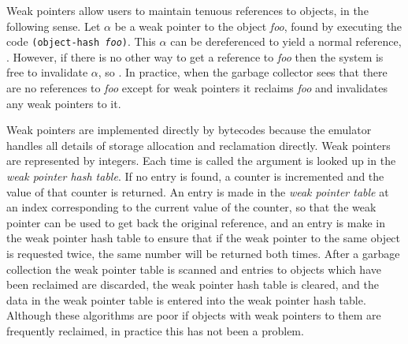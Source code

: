 Weak pointers allow users to maintain tenuous references to objects,
in the following sense.  Let $\alpha$ be a weak pointer to the object
\emph{foo}, found by executing the code \texttt{(object-hash \emph{foo})}.
This $\alpha$ can be dereferenced to yield a normal reference,
.  However, if there is no
other way to get a reference to \emph{foo} then the system is free to
invalidate $\alpha$, so .  In
practice, when the garbage collector sees that there are no references
to \emph{foo} except for weak pointers it reclaims \emph{foo} and
invalidates any weak pointers to it.

Weak pointers are implemented directly by bytecodes because the
emulator handles all details of storage allocation and reclamation
directly.  Weak pointers are represented by integers.  Each time
 is called the argument is looked up in the
\emph{weak pointer hash table}.  If no entry is found, a counter is
incremented and the value of that counter is returned.  An entry is
made in the \emph{weak pointer table} at an index corresponding to the
current value of the counter, so that the weak pointer can be used to
get back the original reference, and an entry is make in the weak
pointer hash table to ensure that if the weak pointer to the same
object is requested twice, the same number will be returned both
times.  After a garbage collection the weak pointer table is scanned
and entries to objects which have been reclaimed are discarded, the
weak pointer hash table is cleared, and the data in the weak pointer
table is entered into the weak pointer hash table.  Although these
algorithms are poor if objects with weak pointers to them are
frequently reclaimed, in practice this has not been a problem.
